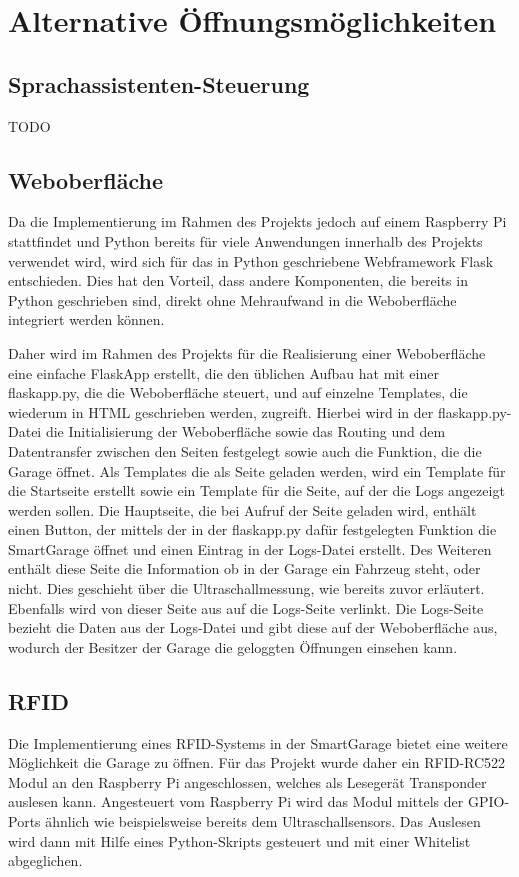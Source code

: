 \chapter{Alternative Öffnungsmöglichkeiten}

\section{Sprachassistenten-Steuerung}
TODO

\section{Weboberfläche}
Da die Implementierung im Rahmen des Projekts jedoch auf einem Raspberry Pi stattfindet und Python bereits für viele Anwendungen innerhalb des Projekts verwendet wird, wird sich für das in Python geschriebene Webframework Flask entschieden. Dies hat den Vorteil, dass andere Komponenten, die bereits in Python geschrieben sind, direkt ohne Mehraufwand in die Weboberfläche integriert werden können.

Daher wird im Rahmen des Projekts für die Realisierung einer Weboberfläche eine einfache FlaskApp erstellt, die den üblichen Aufbau hat mit einer flaskapp.py, die die Weboberfläche steuert, und auf einzelne Templates, die wiederum in HTML geschrieben werden, zugreift. Hierbei wird in der flaskapp.py-Datei die Initialisierung der Weboberfläche sowie das Routing und dem Datentransfer zwischen den Seiten festgelegt sowie auch die Funktion, die die Garage öffnet. Als Templates die als Seite geladen werden, wird ein Template für die Startseite erstellt sowie ein Template für die Seite, auf der die Logs angezeigt werden sollen. Die Hauptseite, die bei Aufruf der Seite geladen wird, enthält einen Button, der mittels der in der flaskapp.py dafür festgelegten Funktion die SmartGarage öffnet und einen Eintrag in der Logs-Datei erstellt. Des Weiteren enthält diese Seite die Information ob in der Garage ein Fahrzeug steht, oder nicht. Dies geschieht über die Ultraschallmessung, wie bereits zuvor erläutert. Ebenfalls wird von dieser Seite aus auf die Logs-Seite verlinkt. Die Logs-Seite bezieht die Daten aus der Logs-Datei und gibt diese auf der Weboberfläche aus, wodurch der Besitzer der Garage die geloggten Öffnungen einsehen kann.

\section{RFID}
Die Implementierung eines RFID-Systems in der SmartGarage bietet eine weitere Möglichkeit die Garage zu öffnen. Für das Projekt wurde daher ein RFID-RC522 Modul an den Raspberry Pi angeschlossen, welches als Lesegerät Transponder auslesen kann. Angesteuert vom Raspberry Pi wird das Modul mittels der GPIO-Ports ähnlich wie beispielsweise bereits dem Ultraschallsensors. Das Auslesen wird dann mit Hilfe eines Python-Skripts gesteuert und mit einer Whitelist abgeglichen.

